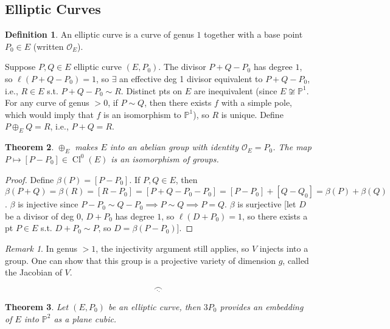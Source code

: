 \documentclass{article}
\theoremstyle{definition}
\newtheorem{defn}{Definition}[section]
\theoremstyle{remark}
\newtheorem{rem}{Remark}
\theoremstyle{plain}
\newtheorem{thm}[defn]{Theorem}
\newcommand{\PP}{\mathbb{P}}
\newcommand{\cl}{\operatorname{Cl}}
\begin{document}
\subsection{Elliptic Curves}
\begin{defn}
    An elliptic curve is a curve of genus $1$ together with a base point $P_0\in E$ (written $\mathcal O_E$).
\end{defn}
Suppose $P,Q\in E$ elliptic curve $(E,P_0)$. The divisor $P+Q-P_0$ has degree $1$, so $\ell(P+Q-P_0)=1$, so $\exists$ an effective deg 1 divisor equivalent to $P+Q-P_0$, i.e., $R\in E$ s.t. $P+Q-P_0\sim R$. Distinct pts on $E$ are inequivalent (since $E\not\cong\PP^1$. For any curve of genus $>0$, if $P\sim Q$, then there exists $f$ with a simple pole, which would imply that $f$ is an isomorphism to $\PP^1$), so $R$ is unique. Define $P\oplus_E Q=R$, i.e., $P+Q=R$. 
\begin{thm}
    $\oplus_E$ makes $E$ into an abelian group with identity $\mathcal O_E=P_0$. The map $P\mapsto [P-P_0]\in\cl^0(E)$ is an isomorphism of groups.
\end{thm}
\begin{proof}
    Define $\beta(P)=[P-P_0]$. If $P,Q\in E$, then $\beta(P+Q)=\beta(R)=[R-P_0]=[P+Q-P_0-P_0]=[P-P_0]+[Q-Q_0]=\beta(P)+\beta(Q)$. $\beta$ is injective since $P-P_0\sim Q-P_0\implies P\sim Q\implies P=Q$. $\beta$ is surjective [let $D$ be a divisor of deg $0$, $D+P_0$ has degree $1$, so $\ell(D+P_0)=1$, so there exists a pt $P\in E$ s.t. $D+P_0\sim P$, so $D=\beta(P-P_0)$].
\end{proof}
\begin{rem}
    In genus $>1$, the injectivity argument still applies, so $V$ injects into a group. One can show that this group is a projective variety of dimension $g$, called the Jacobian of $V$.
\end{rem}
\[\underset{\cdot.}{\frown}\tag{Owen's signature}\]
\begin{thm}
    Let $(E,P_0)$ be an elliptic curve, then $3P_0$ provides an embedding of $E$ into $\PP^2$ as a plane cubic.
\end{thm}
\end{document}
